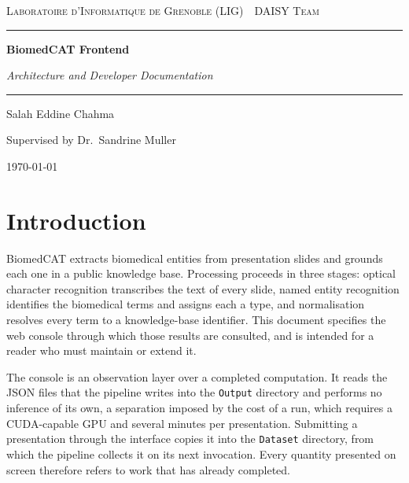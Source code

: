 \documentclass[11pt,a4paper]{article}
\newcommand{\docTitle}{BiomedCAT Frontend}
\newcommand{\docSubtitle}{Architecture and Developer Documentation}
\newcommand{\docAuthor}{Salah Eddine Chahma}
\newcommand{\docSupervisor}{Dr.\ Sandrine Muller}
\newcommand{\docTeam}{DAISY Team}
\newcommand{\docLab}{Laboratoire d'Informatique de Grenoble (LIG)}
\begin{document}
\thispagestyle{plain}

\begin{center}
  {\footnotesize\scshape \docLab\ \textperiodcentered\ \docTeam \par}

  \vspace{0.9em}
  \rule{\textwidth}{0.8pt}
  \vspace{0.55em}

  {\LARGE\bfseries \docTitle \par}
  \vspace{0.35em}
  {\large\itshape \docSubtitle \par}

  \vspace{0.55em}
  \rule{\textwidth}{0.4pt}

  \vspace{0.8em}
  {\normalsize \docAuthor \par}
  \vspace{0.2em}
  {\footnotesize Supervised by \docSupervisor \par}
  \vspace{0.5em}
  {\footnotesize \today \par}
\end{center}

\vspace{0.8em}

\section{Introduction}

BiomedCAT extracts biomedical entities from presentation slides and grounds each
one in a public knowledge base. Processing proceeds in three stages: optical
character recognition transcribes the text of every slide, named entity
recognition identifies the biomedical terms and assigns each a type, and
normalisation resolves every term to a knowledge-base identifier. This document
specifies the web console through which those results are consulted, and is
intended for a reader who must maintain or extend it.

The console is an observation layer over a completed computation. It reads the
JSON files that the pipeline writes into the \texttt{Output} directory and
performs no inference of its own, a separation imposed by the cost of a run,
which requires a CUDA-capable GPU and several minutes per presentation. Submitting a presentation
through the interface copies it into the \texttt{Dataset} directory, from which
the pipeline collects it on its next invocation. Every quantity presented on
screen therefore refers to work that has already completed.
\end{document}
